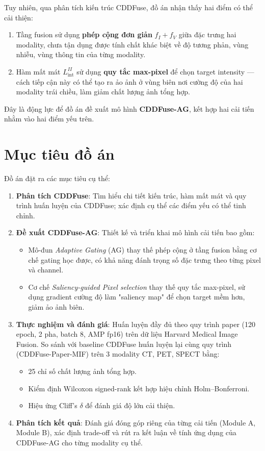 Tuy nhiên, qua phân tích kiến trúc CDDFuse, đồ án nhận thấy hai điểm có thể cải thiện:
\begin{enumerate}\itemsep2pt
    \item Tầng fusion sử dụng \textbf{phép cộng đơn giản} $f_I + f_V$ giữa đặc trưng hai modality, chưa tận dụng được tính chất khác biệt về độ tương phản, vùng nhiễu, vùng thông tin của từng modality.
    \item Hàm mất mát $L_{\mathrm{int}}^{II}$ sử dụng \textbf{quy tắc max-pixel} để chọn target intensity --- cách tiếp cận này có thể tạo ra ảo ảnh ở vùng biên nơi cường độ của hai modality trái chiều, làm giảm chất lượng ảnh tổng hợp.
\end{enumerate}

Đây là động lực để đồ án đề xuất mô hình \textbf{CDDFuse-AG}, kết hợp hai cải tiến nhằm vào hai điểm yếu trên.

\section{Mục tiêu đồ án}
\label{sec:goal}

Đồ án đặt ra các mục tiêu cụ thể:

\begin{enumerate}\itemsep2pt
    \item \textbf{Phân tích CDDFuse}: Tìm hiểu chi tiết kiến trúc, hàm mất mát và quy trình huấn luyện của CDDFuse; xác định cụ thể các điểm yếu có thể tinh chỉnh.
    \item \textbf{Đề xuất CDDFuse-AG}: Thiết kế và triển khai mô hình cải tiến bao gồm:
        \begin{itemize}\itemsep0pt
            \item Mô-đun \emph{Adaptive Gating} (AG) thay thế phép cộng ở tầng fusion bằng cơ chế gating học được, có khả năng đánh trọng số đặc trưng theo từng pixel và channel.
            \item Cơ chế \emph{Saliency-guided Pixel selection} thay thế quy tắc max-pixel, sử dụng gradient cường độ làm "saliency map" để chọn target mềm hơn, giảm ảo ảnh biên.
        \end{itemize}
    \item \textbf{Thực nghiệm và đánh giá}: Huấn luyện đầy đủ theo quy trình paper (120 epoch, 2 pha, batch 8, AMP fp16) trên dữ liệu Harvard Medical Image Fusion. So sánh với baseline CDDFuse huấn luyện lại cùng quy trình (CDDFuse-Paper-MIF) trên 3 modality CT, PET, SPECT bằng:
        \begin{itemize}\itemsep0pt
            \item 25 chỉ số chất lượng ảnh tổng hợp.
            \item Kiểm định Wilcoxon signed-rank kết hợp hiệu chỉnh Holm--Bonferroni.
            \item Hiệu ứng Cliff's $\delta$ để đánh giá độ lớn cải thiện.
        \end{itemize}
    \item \textbf{Phân tích kết quả}: Đánh giá đóng góp riêng của từng cải tiến (Module A, Module B), xác định trade-off và rút ra kết luận về tính ứng dụng của CDDFuse-AG cho từng modality cụ thể.
\end{enumerate}

